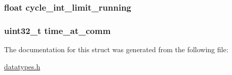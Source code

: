 \subsubsection[{cycle\+\_\+int\+\_\+limit\+\_\+running}]{\setlength{\rightskip}{0pt plus 5cm}float cycle\+\_\+int\+\_\+limit\+\_\+running}\label{structmc__rpm__dep__struct_ac5df70776f630c4f834ab3b7ab6b6aad}
\hypertarget{structmc__rpm__dep__struct_a2818616e9041447e693afed3790e59a9}{}
\subsubsection[{time\+\_\+at\+\_\+comm}]{\setlength{\rightskip}{0pt plus 5cm}uint32\+\_\+t time\+\_\+at\+\_\+comm}\label{structmc__rpm__dep__struct_a2818616e9041447e693afed3790e59a9}


The documentation for this struct was generated from the following file\+:\begin{DoxyCompactItemize}
\item 
\hyperlink{datatypes_8h}{datatypes.\+h}\end{DoxyCompactItemize}
